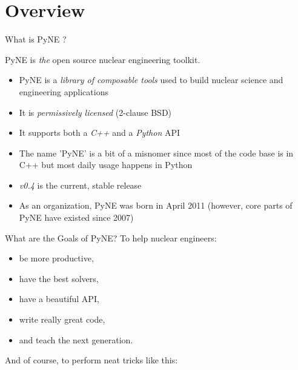 \documentclass[xcolor=x11names,compress]{beamer}
\renewcommand{\(}{\begin{columns}}
\renewcommand{\)}{\end{columns}}
\newcommand{\<}[1]{\begin{column}{#1}}
\renewcommand{\>}{\end{column}}
\begin{document}
\section{Overview}
\begin{frame}{What is PyNE \cite{pyne}?}

PyNE is \textit{the} open source nuclear engineering toolkit.
\vspace*{1em}
  \begin{itemize}
  \item PyNE is a \textit{library of composable tools} used to build nuclear science and engineering applications
  \item It is \textit{permissively licensed} (2-clause BSD)
  \item It supports both a \textit{C++} and a \textit{Python} API
  \item The name 'PyNE' is a bit of a misnomer since most of the code base is in C++ but most daily usage happens in Python
  \item \textit{v0.4} is the current, stable release
  \item As an organization, PyNE was born in April 2011 (however, core parts of PyNE have existed since 2007)
  \end{itemize}

\end{frame}

\begin{frame}{What are the Goals of PyNE?}
To help nuclear engineers:
  \begin{itemize}
  \item be more productive,
  \item have the best solvers,
  \item have a beautiful API,
  \item write really great code,
  \item and teach the next generation.
  \end{itemize}
  
And of course, to perform neat tricks like this:

\end{frame}

%
\end{document}

